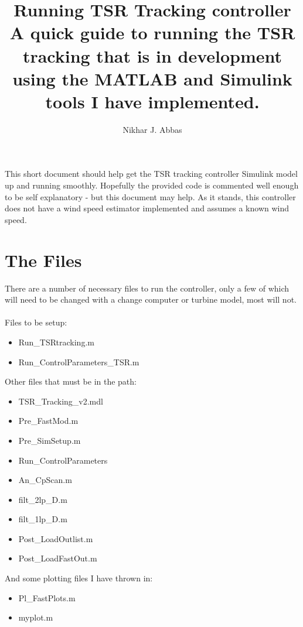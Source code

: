 \documentclass{article}
\begin{document}
\title{Running TSR Tracking controller\\
	\small A quick guide to running the TSR tracking that is in development using the MATLAB and Simulink tools I have implemented. }
\author{Nikhar J. Abbas}

\maketitle

This short document should help get the TSR tracking controller Simulink model up and running smoothly. Hopefully the provided code is commented well enough to be self explanatory - but this document may help. As it stands, this controller does not have a wind speed estimator implemented and assumes a known wind speed.  

\section*{The Files}
There are a number of necessary files to run the controller, only a few of which will need to be changed with a change computer or turbine model, most will not. 
\\ \\
Files to be setup:
\begin{itemize}
\item Run\_TSRtracking.m
\item Run\_ControlParameters\_TSR.m
\end{itemize}
Other files that must be in the path:
\begin{itemize}
\item TSR\_Tracking\_v2.mdl
\item Pre\_FastMod.m
\item Pre\_SimSetup.m
\item Run\_ControlParameters
\item An\_CpScan.m
\item filt\_2lp\_D.m
\item filt\_1lp\_D.m
\item Post\_LoadOutlist.m
\item Post\_LoadFastOut.m
\end{itemize}
And some plotting files I have thrown in:
\begin{itemize}
\item Pl\_FastPlots.m
\item myplot.m
\end{itemize}
\end{document}
